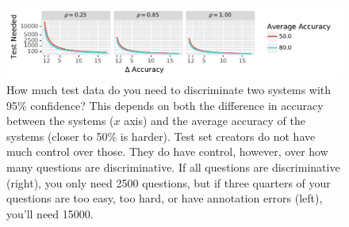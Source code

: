 \begin{figure}[t!]
    \begin{center}
    \includegraphics[width=1.0\linewidth]{figures/datasets/test_set}
    \end{center}
    \caption{
    How much test data do you need to discriminate two systems with 95\% confidence?  This depends on both the difference in accuracy between the systems ($x$ axis) and the average accuracy of the systems (closer to 50\% is harder).  Test set creators do not have much control over those.  They do have control, however, over how many questions are discriminative.  If all questions are discriminative (right), you only need 2500 questions, but if three quarters of your questions are too easy, too hard, or have annotation errors (left), you'll need 15000.}
    \label{fig:how-big}
\end{figure}
